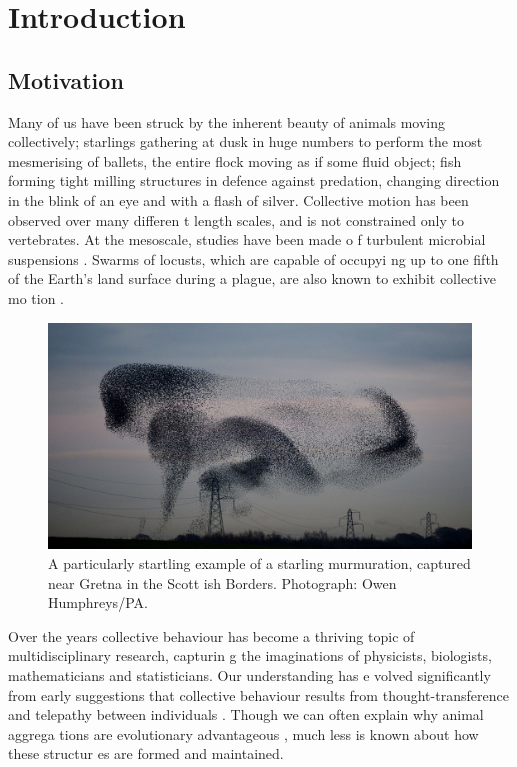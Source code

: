 \graphicspath{{fig/introduction/}}

\chapter{Introduction}
\label{cha:introduction}

\section{Motivation}
\label{sec:motivation}

Many of us have been struck by the inherent beauty of animals moving collectively; starlings gathering 
at dusk in huge numbers to perform the most mesmerising of ballets, the entire flock moving as if some 
fluid object; fish forming tight milling structures in defence against predation, changing direction in
 the blink of an eye and with a flash of silver. Collective motion has been observed over many differen
t length scales, and is not constrained only to vertebrates. At the mesoscale, studies have been made o
f turbulent microbial suspensions \parencite{dunkel13}. Swarms of locusts, which are capable of occupyi
ng up to one fifth of the Earth's land surface during a plague, are also known to exhibit collective mo
tion \parencite{bazazi08}.

\begin{figure}[!htbp]
	\includegraphics[width=\textwidth]{murmuration.jpg}
	\caption{A particularly startling example of a starling murmuration, captured near Gretna in the Scott
ish Borders. Photograph: Owen Humphreys/PA.}
	\label{fig:murmuration}
\end{figure}

Over the years collective behaviour has become a thriving topic of multidisciplinary research, capturin
g the imaginations of physicists, biologists, mathematicians and statisticians. Our understanding has e
volved significantly from early suggestions that collective behaviour results from thought-transference
 and telepathy between individuals \parencite{selous31}. Though we can often explain why animal aggrega
tions are evolutionary advantageous \parencite{giardina08}, much less is known about how these structur
es are formed and maintained.

